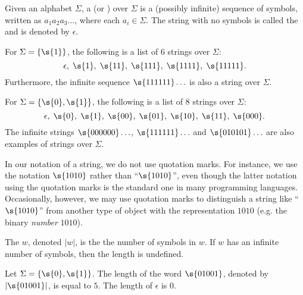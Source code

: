 \begin{flex}
\begin{definition} \label{definition:String-word-empty-string}
Given an alphabet $\Sigma$, a  (or ) over $\Sigma$ is a (possibly infinite) sequence of symbols, written as $a_1a_2a_3\ldots$, where each $a_i \in \Sigma$. 
The string with no symbols is called the  and is denoted by $\epsilon$.
\end{definition}

\begin{example} \label{example:Strings-over-the-unary-alphabet}
For $\Sigma = \{\s{1}\}$, the following is a list of 6 strings over $\Sigma$: 
\[
    \epsilon,\; \s{1},\; \s{11},\; \s{111},\; \s{1111},\; \s{11111}.
\]
Furthermore, the infinite sequence $\s{111111}\ldots$ is also a string over $\Sigma$.
\end{example}

\begin{example} \label{example:Strings-over-the-binary-alphabet}
For $\Sigma = \{\s{0},\s{1}\}$, the following is a list of 8 strings over $\Sigma$: 
\[
\epsilon,\; \s{0},\; \s{1},\; \s{00},\; \s{01},\; \s{10},\; \s{11},\; \s{000}.
\] 
The infinite strings $\s{000000}\ldots$, $\s{111111}\ldots$ and $\s{010101}\ldots$ are also examples of strings over $\Sigma$.
\end{example}
\end{flex}

\begin{note} \label{note:Strings-and-quotation-marks}
In our notation of a string, we do not use quotation marks. For instance, we use the notation $\s{1010}$ rather than ``$\s{1010}$'', even though the latter notation using the quotation marks is the standard one in many programming languages. Occasionally, however, we may use quotation marks to distinguish a string like ``$\s{1010}$'' from another type of object with the representation $1010$ (e.g. the binary \emph{number} $1010$).
\end{note}

\begin{flex}
\begin{definition} \label{definition:Length-of-a-string}
The  $w$, denoted $|w|$, is the the number of symbols in $w$. 
If $w$ has an infinite number of symbols, then the length is undefined.
\end{definition}

\begin{example} \label{example:Lengths-of-01001-and-epsilon}
Let $\Sigma=\{\s{0},\s{1}\}$. 
The length of the word $\s{01001}$, denoted by $|\s{01001}|$, is equal to $5$. 
The length of $\epsilon$ is 0.
\end{example}
\end{flex}

